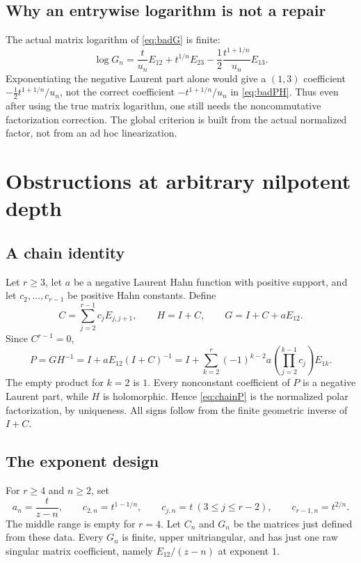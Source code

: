 \documentclass[11pt,letterpaper]{article}
\theoremstyle{definition}
\theoremstyle{remark}
\numberwithin{equation}{section}
\begin{document}
\subsection{Why an entrywise logarithm is not a repair}

The actual matrix logarithm of \eqref{eq:badG} is finite:
\[
 \log G_n=
 \frac{t}{u_n}E_{12}+t^{1/n}E_{23}
 -\frac12\frac{t^{1+1/n}}{u_n}E_{13}.
\]
Exponentiating the negative Laurent part alone would give a $(1,3)$ coefficient $-\tfrac12t^{1+1/n}/u_n$, not the correct coefficient $-t^{1+1/n}/u_n$ in \eqref{eq:badPH}. Thus even after using the true matrix logarithm, one still needs the noncommutative factorization correction. The global criterion is built from the actual normalized factor, not from an ad hoc linearization.

\section{Obstructions at arbitrary nilpotent depth}\label{sec:depth}

\subsection{A chain identity}

Let $r\geq3$, let $a$ be a negative Laurent Hahn function with positive support, and let $c_2,\ldots,c_{r-1}$ be positive Hahn constants. Define
\[
 C=\sum_{j=2}^{r-1}c_jE_{j,j+1},\qquad
 H=I+C,\qquad G=I+C+aE_{12}.
\]
Since $C^{r-1}=0$,
\begin{equation}\label{eq:chainP}
 P=GH^{-1}
  =I+aE_{12}(I+C)^{-1}
  =I+\sum_{k=2}^{r}(-1)^{k-2}
      a\left(\prod_{j=2}^{k-1}c_j\right)E_{1k}.
\end{equation}
The empty product for $k=2$ is $1$. Every nonconstant coefficient of $P$ is a negative Laurent part, while $H$ is holomorphic. Hence \eqref{eq:chainP} is the normalized polar factorization, by uniqueness. All signs follow from the finite geometric inverse of $I+C$.

\subsection{The exponent design}

For $r\geq4$ and $n\geq2$, set
\begin{equation}\label{eq:deepdata}
 a_n=\frac{t}{z-n},\qquad
 c_{2,n}=t^{1-1/n},\qquad
 c_{j,n}=t\ (3\leq j\leq r-2),\qquad
 c_{r-1,n}=t^{2/n}.
\end{equation}
The middle range is empty for $r=4$. Let $C_n$ and $G_n$ be the matrices just defined from these data. Every $G_n$ is finite, upper unitriangular, and has just one raw singular matrix coefficient, namely $E_{12}/(z-n)$ at exponent $1$.
\end{document}
